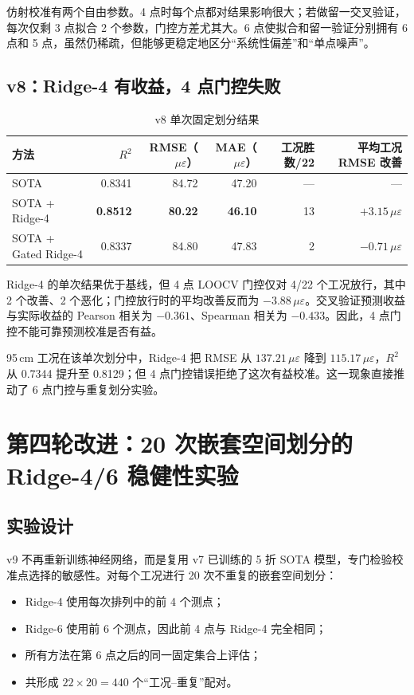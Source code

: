 \documentclass[11pt,a4paper]{article}
\newcommand{\ue}{\,\mu\varepsilon}
\newcommand{\good}[1]{\textcolor{Secondary}{\bfseries #1}}
\begin{document}
仿射校准有两个自由参数。4 点时每个点都对结果影响很大；若做留一交叉验证，每次仅剩 3 点拟合 2 个参数，门控方差尤其大。6 点使拟合和留一验证分别拥有 6 点和 5 点，虽然仍稀疏，但能够更稳定地区分“系统性偏差”和“单点噪声”。

\subsection{v8：Ridge-4 有收益，4 点门控失败}

\begin{table}[H]
\centering
\caption{v8 单次固定划分结果}
\label{tab:v8}
\small
\begin{tabular}{lrrrrr}
\toprule
方法 & $R^2$ & RMSE（$\ue$） & MAE（$\ue$） & 工况胜数/22 & 平均工况 RMSE 改善\\
\midrule
SOTA & 0.8341 & 84.72 & 47.20 & --- & ---\\
SOTA + Ridge-4 & \good{0.8512} & \good{80.22} & \good{46.10} & 13 & $+3.15\ue$\\
SOTA + Gated Ridge-4 & 0.8337 & 84.80 & 47.83 & 2 & $-0.71\ue$\\
\bottomrule
\end{tabular}
\end{table}

Ridge-4 的单次结果优于基线，但 4 点 LOOCV 门控仅对 4/22 个工况放行，其中 2 个改善、2 个恶化；门控放行时的平均改善反而为 $-3.88\ue$。交叉验证预测收益与实际收益的 Pearson 相关为 $-0.361$、Spearman 相关为 $-0.433$。因此，4 点门控不能可靠预测校准是否有益。

95\,cm 工况在该单次划分中，Ridge-4 把 RMSE 从 $137.21\ue$ 降到 $115.17\ue$，$R^2$ 从 0.7344 提升至 0.8129；但 4 点门控错误拒绝了这次有益校准。这一现象直接推动了 6 点门控与重复划分实验。

\section{第四轮改进：20 次嵌套空间划分的 Ridge-4/6 稳健性实验}

\subsection{实验设计}

v9 不再重新训练神经网络，而是复用 v7 已训练的 5 折 SOTA 模型，专门检验校准点选择的敏感性。对每个工况进行 20 次不重复的嵌套空间划分：

\begin{itemize}
  \item Ridge-4 使用每次排列中的前 4 个测点；
  \item Ridge-6 使用前 6 个测点，因此前 4 点与 Ridge-4 完全相同；
  \item 所有方法在第 6 点之后的同一固定集合上评估；
  \item 共形成 $22\times20=440$ 个“工况--重复”配对。
\end{itemize}
\end{document}
